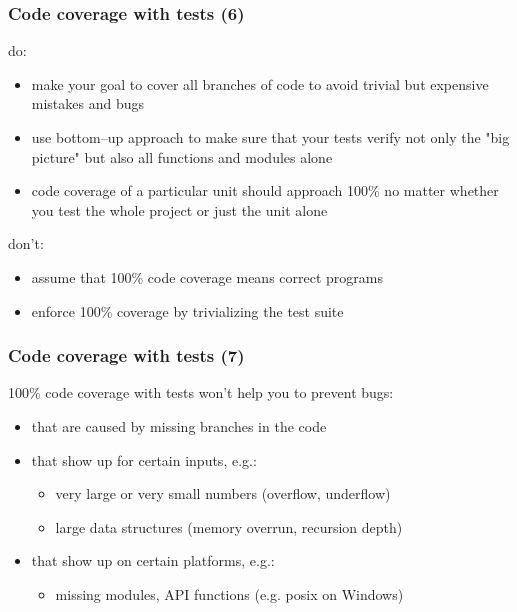 \documentclass{beamer}
\begin{document}
\begin{frame}[fragile]
    \frametitle{Code coverage with tests (6)}

    {\color{green} do}:
    \begin{itemize}
        \item make your goal to cover all branches of code to avoid
        trivial but expensive mistakes and bugs
        \item use bottom--up approach to make sure that your tests
        verify not only the "big picture" but also all functions
        and modules alone
        \item code coverage of a particular unit should approach
        100\% no matter whether you test the whole project or just
        the unit alone
    \end{itemize}
    \pause
    {\color{red} don't}:
    \begin{itemize}
        \item assume that 100\% code coverage means correct programs
        \item enforce 100\% coverage by trivializing the test suite
    \end{itemize}
\end{frame}

\begin{frame}[fragile]
    \frametitle{Code coverage with tests (7)}

    100\% code coverage with tests won't help you to prevent bugs:
    \begin{itemize}
        \item that are caused by missing branches in the code
        \pause
        \item that show up for certain inputs, e.g.:
            \begin{itemize}
                \item very large or very small numbers (overflow, underflow)
                \item large data structures (memory overrun, recursion depth)
            \end{itemize}
        \pause
        \item that show up on certain platforms, e.g.:
            \begin{itemize}
                \item missing modules, API functions (e.g. posix on Windows)
            \end{itemize}
    \end{itemize}
\end{frame}
\end{document}
